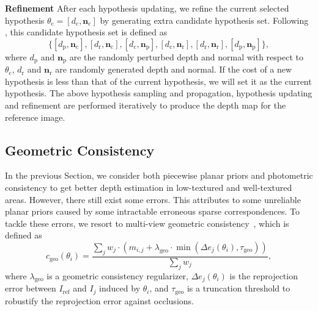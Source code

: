 \documentclass[letterpaper]{article} %
\begin{document}
\noindent\textbf{Refinement} After each hypothesis updating, we refine the current selected hypothesis $\theta_{\text{c}}=[d_\text{c},\boldsymbol{n}_\text{c}]$ by generating extra candidate hypothesis set. Following \cite{Schonberger2016Pixelwise,Xu2018Multi}, this candidate hypothesis set is defined as
\begin{equation}\label{eq:12}
\{[d_\text{p},\boldsymbol{n}_\text{c}],[d_\text{r},\boldsymbol{n}_\text{c}],[d_\text{c},\boldsymbol{n}_\text{p}],[d_\text{c},\boldsymbol{n}_\text{r}],[d_\text{r},\boldsymbol{n}_\text{r}],[d_\text{p},\boldsymbol{n}_\text{p}]\},
\end{equation}
where $d_\text{p}$ and $\boldsymbol{n}_\text{p}$ are the randomly perturbed depth and normal with respect to $\theta_\text{c}$, $d_\text{r}$ and $\boldsymbol{n}_\text{r}$ are randomly generated depth and normal. If the cost of a new hypothesis is less than that of the current hypothesis, we will set it as the current hypothesis. The above hypothesis sampling and propagation, hypothesis updating and refinement are performed iteratively to produce the depth map for the reference image.

\subsection{Geometric Consistency}

In the previous Section, we consider both piecewise planar priors and photometric consistency to get better depth estimation in low-textured and well-textured areas. However, there still exist some errors. This attributes to some unreliable planar priors caused by some intractable erroneous sparse correspondences. To tackle these errors, we resort to multi-view geometric consistency~\cite{Schonberger2016Pixelwise,Xu2018Multi}, %
which is defined as
\begin{equation}\label{eq:13}
c_\text{geo}(\theta_{i})=\frac{\sum_{j}w_{j}\cdot (m_{i,j}+\lambda_\text{geo}\cdot \displaystyle\mathop{\min}(\Delta e_{j}(\theta_{i}),\tau_\text{geo}))}{\sum_{j}w_{j}},
\end{equation}
where $\lambda_\text{geo}$ is a geometric consistency regularizer, $\Delta{e}_{j}(\theta_{i})$ is the reprojection error between $I_\text{ref}$ and $I_{j}$ induced by $\theta_{i}$, and $\tau_\text{geo}$ is a truncation threshold to robustify the reprojection error against occlusions.
\end{document}
